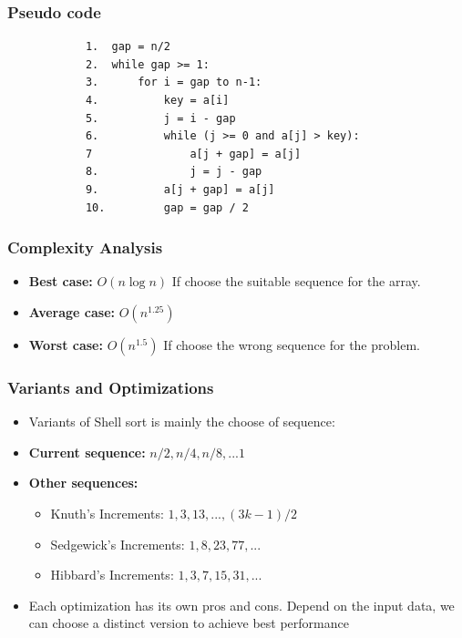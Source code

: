     \subsubsection{Pseudo code} 
        \begin{verbatim}
            1.  gap = n/2
            2.  while gap >= 1:
            3.      for i = gap to n-1:
            4.          key = a[i]
            5.          j = i - gap
            6.          while (j >= 0 and a[j] > key):
            7               a[j + gap] = a[j]
            8.              j = j - gap
            9.          a[j + gap] = a[j]
            10.         gap = gap / 2      
        \end{verbatim}

    \subsubsection{Complexity Analysis}
        \begin{itemize}
            \item \textbf{Best case:} $O(n\log n)$
            \subitem If choose the suitable sequence for the array.
            \item \textbf{Average case:} $O(n^{1.25}) $
            \item \textbf{Worst case:} $O(n^{1.5})$
            \subitem If choose the wrong sequence for the problem.
        \end{itemize}
    

    \subsubsection{Variants and Optimizations} 
    \begin{itemize}
        \item Variants of Shell sort is mainly the choose of sequence:
        \item \textbf{Current sequence: } $n/2,n/4,n/8,...1$
        \item \textbf{Other sequences: }
        \begin{itemize}
            \item Knuth's Increments: $1,3,13,...,(3k-1)/2$
            \item Sedgewick's Increments: $1,8,23,77,...$
            \item Hibbard's Increments: $1,3,7,15,31,...$
        \end{itemize}
        \item Each optimization has its own pros and cons. Depend on the input data, we can choose a distinct version to achieve best performance
    \end{itemize}

